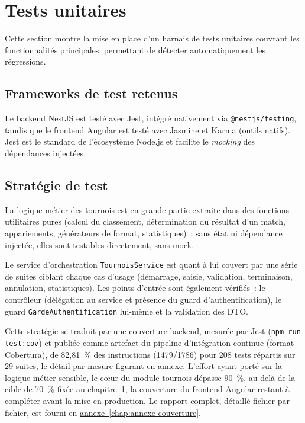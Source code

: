 
\section{Tests unitaires}\label{sec:tests-unitaires}

Cette section montre la mise en place d'un harnais de tests unitaires couvrant les fonctionnalités principales, permettant de détecter automatiquement les régressions.

\subsection{Frameworks de test retenus}
Le backend NestJS est testé avec Jest, intégré nativement via \texttt{@nestjs/testing}, tandis que le frontend Angular est testé avec Jasmine et Karma (outils natifs). Jest est le standard de l'écosystème Node.js et facilite le \emph{mocking} des dépendances injectées.

\subsection{Stratégie de test}
La logique métier des tournois est en grande partie extraite dans des fonctions utilitaires pures (calcul du classement, détermination du résultat d'un match, appariements, générateurs de format, statistiques)~: sans état ni dépendance injectée, elles sont testables directement, sans mock.

Le service d'orchestration \texttt{TournoisService} est quant à lui couvert par une série de suites ciblant chaque cas d'usage (démarrage, saisie, validation, terminaison, annulation, statistiques). Les points d'entrée sont également vérifiés~: le contrôleur (délégation au service et présence du guard d'authentification), le guard \texttt{GardeAuthentification} lui-même et la validation des DTO.

Cette stratégie se traduit par une couverture backend, mesurée par Jest (\texttt{npm run test:cov}) et publiée comme artefact du pipeline d'intégration continue (format Cobertura), de 82,81~\% des instructions (1479/1786) pour 208 tests répartis sur 29 suites, le détail par mesure figurant en annexe. L'effort ayant porté sur la logique métier sensible, le cœur du module tournois dépasse 90~\%, au-delà de la cible de 70~\% fixée au chapitre~1, la couverture du frontend Angular restant à compléter avant la mise en production. Le rapport complet, détaillé fichier par fichier, est fourni en \hyperref[chap:annexe-couverture]{annexe~\ref*{chap:annexe-couverture}}.

